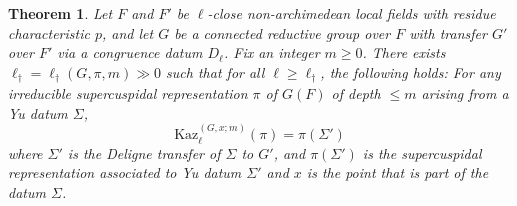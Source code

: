 \documentclass[american]{article}
\numberwithin{equation}{section}
\numberwithin{figure}{section}
\theoremstyle{plain}
\newtheorem{theorem}{Theorem}[section]
\theoremstyle{definition}
\theoremstyle{remark}
\begin{document}
\begin{theorem}\label{thm:ell-close-kaz-yu-compatability}
    Let $F$ and $F'$ be $\ell$-close non-archimedean local fields with residue characteristic $p$, and let $G$ be a connected reductive group over $F$ with transfer $G'$ over $F'$ via a congruence datum $D_\ell$. Fix an integer $m \geq 0$. There exists $\ell_\dagger = \ell_\dagger(G, \pi,m) \gg 0$ such that for all $\ell \geq \ell_\dagger$, the following holds:  
For any irreducible supercuspidal representation $\pi$ of $G(F)$ of depth $\leq m$ arising from a Yu datum $\Sigma$,  
\[
\mathrm{Kaz}_\ell^{(G,x;m)}(\pi) = \pi(\Sigma')
\]  
where $\Sigma'$ is the Deligne transfer of $\Sigma$ to $G'$, and $\pi(\Sigma')$ is the supercuspidal representation associated to Yu datum $\Sigma'$ and $x$ is the point that is part of the datum $\Sigma$.

\end{theorem}
\end{document}
